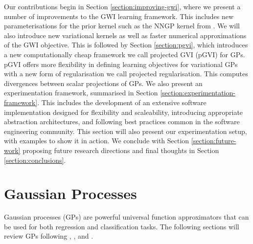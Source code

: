 \documentclass{article}
\numberwithin{equation}{section}
\begin{document}
Our contributions begin in Section \ref{section:improving-gwi}, where we present a number of improvements to the GWI learning framework.
This includes new parameterisations for the prior kernel such as the NNGP kernel from \cite{novak2019neural}.
We will also introduce new variational kernels as well as faster numerical approximations of the GWI objective.
This is followed by Section \ref{section:pgvi}, which introduces a new computationally cheap framework we call projected GVI 
(pGVI) for GPs.
pGVI offers more flexibility in defining learning objectives for variational GPs with a new form of regularisation we call projected regularisation.
This computes divergences between scalar projections of GPs.
We also present an experimentation framework, summarised in Section \ref{section:experimentation-framework}. 
This includes the development of an extensive software implementation designed for flexibility and scaleability, introducing appropriate abstraction architectures, and following best practices common in the software engineering community. 
This section will also present our experimentation setup, with examples to show it in action. We conclude with Section \ref{section:future-work} proposing future research directions and final thoughts in Section \ref{section:conclusions}.

\newpage
\section{Gaussian Processes}\label{section:gaussian-processes}
Gaussian processes (GPs) are powerful universal function approximators that can be used for both regression and classification tasks. The following sections will review GPs following \cite{rasmussen2003gaussian}, \cite{matthews2017scalable}, and \cite{wild2022generalized}.
\end{document}
